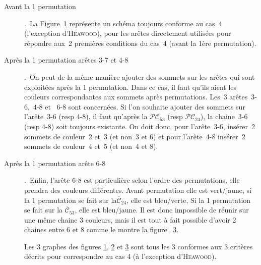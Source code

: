 \begin{description}
\item [Avant la 1 permutation].\
La Figure~\ref{fig:cas4_ext1} représente un schéma toujours conforme au cas~4 (l’exception d'\textsc{Heawood}), pour les arêtes directement utilisées pour répondre aux~2 premières conditions du cas~4 (avant la 1ère permutation).
\begin{figure}[!ht]\centering
		
	\caption{}\label{fig:cas4_ext1}
\end{figure}
\FloatBarrier

\item [Après la 1 permutation arêtes 3-7 et 4-8].\
On peut de la même manière ajouter des sommets sur les arêtes qui sont exploitées après la 1 permutation. Dans ce cas, il faut qu’ils aient les couleurs correspondantes aux sommets après permutations. Les~3 arêtes~3-6,~4-8 et~ 6-8 sont concernées. Si l’on souhaite ajouter des sommets sur l’arête~3-6 (resp 4-8), il faut qu’après la $\mathcal{PC}_{53}$ (resp  $\mathcal{PC}_{24}$), la chaine~3-6 (resp 4-8) soit toujours existante. On doit donc, pour l’arête~3-6, insérer~2 sommets de couleur~2 et~3 (et non~3 et 6) et pour l’arête~4-8 insérer~2 sommets de couleur~4 et~5 (et non~4 et 8).
\begin{figure}[!ht]\centering
		
	\caption{}\label{fig:cas4_ext2}
\end{figure}
\FloatBarrier

\item [Après la 1 permutation arête 6-8].\
Enfin, l’arête 6-8 est particulière selon l’ordre des permutations, elle prendra des couleurs différentes.
Avant permutation elle est vert/jaune, si la 1 permutation se fait sur la$\overline{\mathcal{C}}_{24}$, elle est bleu/verte, Si la 1 permutation se fait sur la $\overline{\mathcal{C}}_{53}$, elle est bleu/jaune. Il est donc impossible de réunir sur une même chaine 3 couleurs, mais il est tout à fait possible d’avoir 2 chaines entre 6 et 8 comme le montre la figure ~\ref{fig:cas4_ext3}.
\begin{figure}[!ht]\centering
		
	\caption{}\label{fig:cas4_ext3}
\end{figure}
\FloatBarrier
Les 3 graphes des figures \ref{fig:cas4_ext1}, \ref{fig:cas4_ext2} et \ref{fig:cas4_ext3} sont tous les 3 conformes aux 3 critères décrits pour correspondre au cas 4 (à l’exception d'\textsc{Heawood}).\\
\end{description}



